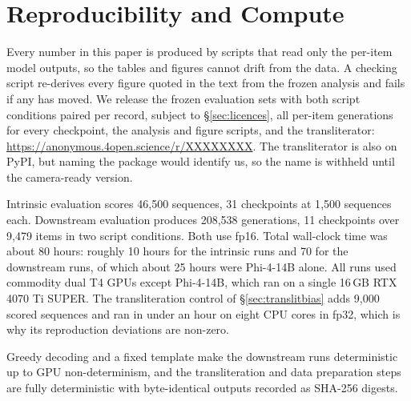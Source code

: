 \documentclass[11pt]{article}
\newcommand{\anonrepo}{\url{https://anonymous.4open.science/r/XXXXXXXX}}
\begin{document}
\section{Reproducibility and Compute}
\label{sec:repro}

Every number in this paper is produced by scripts that read only the per-item
model outputs, so the tables and figures cannot drift from the data. A checking
script re-derives every figure quoted in the text from the frozen analysis and
fails if any has moved. We release the frozen evaluation sets with both script
conditions paired per record, subject to \S\ref{sec:licences}, all per-item
generations for every checkpoint, the analysis and figure scripts, and the
transliterator: \anonrepo. The transliterator is also on PyPI, but naming the
package would identify us, so the name is withheld until the camera-ready version.

Intrinsic evaluation scores 46{,}500 sequences, 31 checkpoints at 1{,}500
sequences each. Downstream evaluation produces 208{,}538 generations, 11
checkpoints over 9{,}479 items in two script conditions. Both use fp16. Total
wall-clock time was about 80 hours: roughly 10 hours for the intrinsic runs and 70
for the downstream runs, of which about 25 hours were Phi-4-14B alone. All runs
used commodity dual T4 GPUs except Phi-4-14B, which ran on a single 16\,GB
RTX 4070 Ti SUPER. The transliteration control of \S\ref{sec:translitbias} adds
9{,}000 scored sequences and ran in under an hour on eight CPU cores in fp32,
which is why its reproduction deviations are non-zero.

Greedy decoding and a fixed template make the downstream runs deterministic up to
GPU non-determinism, and the transliteration and data preparation steps are fully
deterministic with byte-identical outputs recorded as SHA-256 digests.
\end{document}
